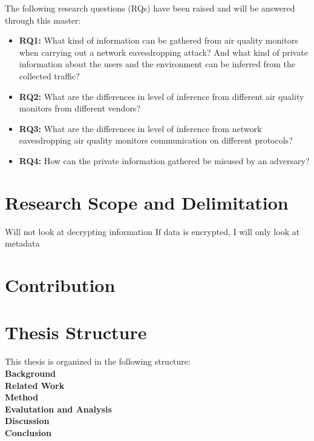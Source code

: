 The following research questions (RQs) have been raised and will be answered through this master:
\begin{itemize}
    \item 
    \textbf{RQ1:} What kind of information can be gathered from air quality monitors when carrying out a network eavesdropping attack? And what kind of private information about the users and the environment can be inferred from the collected traffic?\\
    \item 
    \textbf{RQ2:} What are the differences in level of inference from different air quality monitors from different vendors?\\
    \item
    \textbf{RQ3:} What are the differences in level of inference from network eavesdropping air quality monitors communication on different protocols?\\
    \item 
    \textbf{RQ4:} How can the private information gathered be misused by an adversary?\\
\end{itemize}

\section*{Research Scope and Delimitation}
Will not look at decrypting information
If data is encrypted, I will only look at metadata

\section*{Contribution}

\section*{Thesis Structure}
This thesis is organized in the following structure:\\
\textbf{Background}
\\
\textbf{Related Work}
\\
\textbf{Method}
\\
\textbf{Evalutation and Analysis}
\\
\textbf{Discussion}
\\
\textbf{Conclusion}
\\